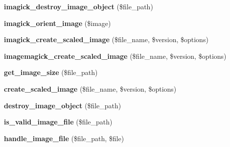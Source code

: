 \begin{DoxyCompactItemize}
\item 
\hypertarget{class_upload_handler_a51cc606ddd9e13d4a5bee43ba26902a9}{{\bfseries imagick\-\_\-destroy\-\_\-image\-\_\-object} (\$file\-\_\-path)}\label{class_upload_handler_a51cc606ddd9e13d4a5bee43ba26902a9}

\item 
\hypertarget{class_upload_handler_a4261aff78afb75e49855eaffd9e074f6}{{\bfseries imagick\-\_\-orient\-\_\-image} (\$image)}\label{class_upload_handler_a4261aff78afb75e49855eaffd9e074f6}

\item 
\hypertarget{class_upload_handler_acded50027ac53d16f483f2e5d94f123e}{{\bfseries imagick\-\_\-create\-\_\-scaled\-\_\-image} (\$file\-\_\-name, \$version, \$options)}\label{class_upload_handler_acded50027ac53d16f483f2e5d94f123e}

\item 
\hypertarget{class_upload_handler_a33fe67777b1290c653ca7fb6dbe43fb1}{{\bfseries imagemagick\-\_\-create\-\_\-scaled\-\_\-image} (\$file\-\_\-name, \$version, \$options)}\label{class_upload_handler_a33fe67777b1290c653ca7fb6dbe43fb1}

\item 
\hypertarget{class_upload_handler_aa77d2ad01e1b8a41eaf9a6cc9f4fb891}{{\bfseries get\-\_\-image\-\_\-size} (\$file\-\_\-path)}\label{class_upload_handler_aa77d2ad01e1b8a41eaf9a6cc9f4fb891}

\item 
\hypertarget{class_upload_handler_ae22ed49a6028a0c065752f658941b9ff}{{\bfseries create\-\_\-scaled\-\_\-image} (\$file\-\_\-name, \$version, \$options)}\label{class_upload_handler_ae22ed49a6028a0c065752f658941b9ff}

\item 
\hypertarget{class_upload_handler_ad896bf47df3adc1807ab71c5c41037ea}{{\bfseries destroy\-\_\-image\-\_\-object} (\$file\-\_\-path)}\label{class_upload_handler_ad896bf47df3adc1807ab71c5c41037ea}

\item 
\hypertarget{class_upload_handler_a36ce54fd9f7251e3a0c0173bf5064f4f}{{\bfseries is\-\_\-valid\-\_\-image\-\_\-file} (\$file\-\_\-path)}\label{class_upload_handler_a36ce54fd9f7251e3a0c0173bf5064f4f}

\item 
\hypertarget{class_upload_handler_ac636e3e6ba585b1f68f419f3ffae9f4d}{{\bfseries handle\-\_\-image\-\_\-file} (\$file\-\_\-path, \$file)}\label{class_upload_handler_ac636e3e6ba585b1f68f419f3ffae9f4d}


\end{DoxyCompactItemize}
